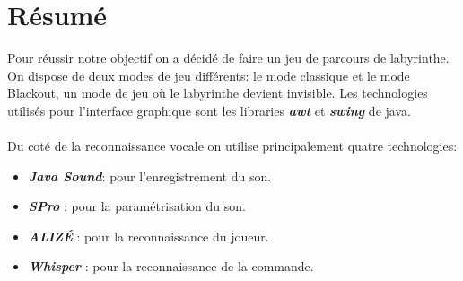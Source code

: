 \section{Résumé}
\label{sec:resume}

Pour réussir notre objectif on a décidé de faire un jeu de parcours de labyrinthe. On dispose de deux modes de jeu différents: le mode classique et le mode Blackout,
un mode de jeu où le labyrinthe devient invisible. Les technologies utilisés pour l'interface graphique sont les libraries \textbf{\textit{awt}} et \textbf{\textit{swing}} de java. \\\\
Du coté de la reconnaissance vocale on utilise principalement quatre technologies:
\begin{itemize}
    \item \textbf{\textit{Java Sound}}: pour l'enregistrement du son.
    \item \textbf{\textit{SPro}} : pour la paramétrisation du son.
    \item \textbf{\textit{ALIZÉ}} : pour la reconnaissance du joueur.
    \item \textbf{\textit{Whisper}} : pour la reconnaissance de la commande.
\end{itemize}
